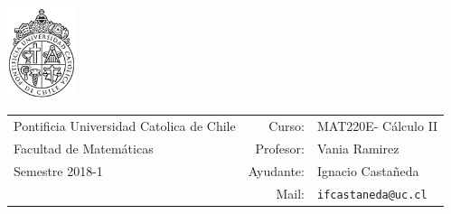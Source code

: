 \documentclass[12pt]{article}
\newcommand{\sigla}{MAT220E}
\newcommand{\nombre}{Cálculo II}
\newcommand{\profesor}{Vania Ramirez}
\newcommand{\ano}{2018}
\newcommand{\semestre}{1}
\begin{document}
\thispagestyle{empty}

\begin{minipage}{2cm}
	\includegraphics[width=2cm]{../../../../img/logo.pdf}
	\vspace{0.5cm}
\end{minipage}
\begin{minipage}{\linewidth}
	\begin{tabular}{lrl}
		{\scriptsize\sc Pontificia Universidad Catolica de Chile} & \hspace*{0.7in}Curso: &
		\sigla - \nombre\\
		{\sc Facultad de Matemáticas}&
		Profesor: & \profesor \\
		{\sc Semestre \ano-\semestre} & Ayudante: & {Ignacio Castañeda}\\
		& {Mail:} & \texttt{ifcastaneda@uc.cl}
	\end{tabular}
\end{minipage}
\end{document}
